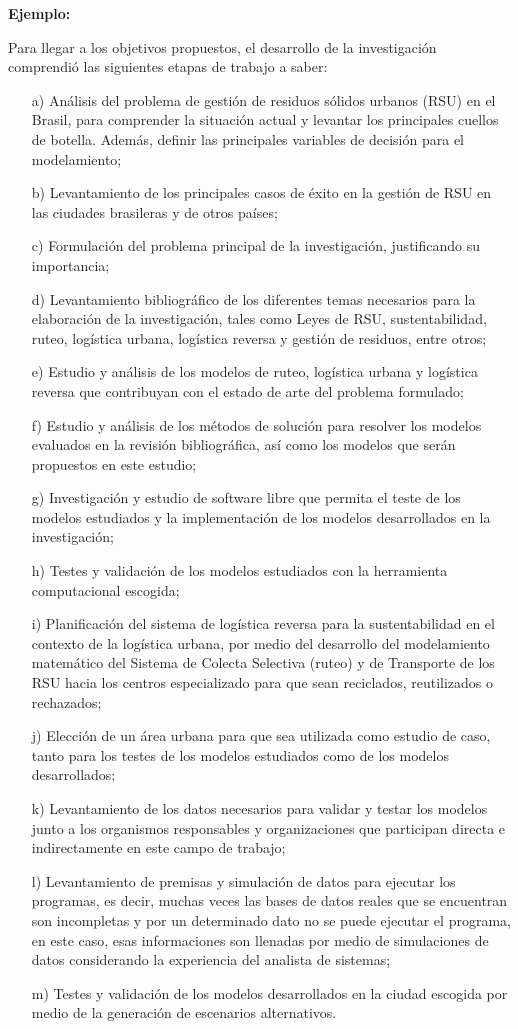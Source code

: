 {\bf Ejemplo:}\par
\vskip 0.1cm
Para llegar a los objetivos propuestos, el desarrollo de la investigación comprendió las siguientes etapas de trabajo a saber:
\begin{enumerate}
\item[a)] Análisis del problema de gestión de residuos sólidos urbanos (RSU) en el Brasil, para comprender la situación actual y levantar los principales cuellos de botella. Además, definir las principales variables de decisión para el modelamiento;
\item[b)]	Levantamiento de los principales casos de éxito en la gestión de RSU en las ciudades brasileras y de otros países;  
\item[c)]	Formulación del problema principal de la investigación, justificando su importancia;
\item[d)]	Levantamiento bibliográfico de los diferentes temas necesarios para la elaboración de la investigación, tales como Leyes de RSU, sustentabilidad, ruteo, logística urbana, logística reversa y gestión de residuos, entre otros;
\item[e)]	Estudio y análisis de los modelos de ruteo, logística urbana y logística reversa que contribuyan con el estado de arte del problema formulado;
\item[f)]	Estudio y análisis de los métodos de solución para resolver los modelos evaluados en la revisión bibliográfica, así como los modelos que serán propuestos en este estudio;
\item[g)]	Investigación y estudio de software libre que permita el teste de los modelos estudiados y la implementación de los modelos desarrollados en la investigación;
\item[h)]	Testes y validación de los modelos estudiados con la herramienta computacional escogida;
\item[i)]	Planificación del sistema de logística reversa para la sustentabilidad en el contexto de la logística urbana, por medio del desarrollo del modelamiento matemático del Sistema de Colecta Selectiva (ruteo) y de Transporte de los RSU hacia los centros especializado para que sean reciclados, reutilizados o rechazados;
\item[j)]	Elección de un área urbana para que sea utilizada como estudio de caso,  tanto para los testes de los modelos estudiados como de los modelos desarrollados;
\item[k)]	Levantamiento de los datos necesarios para validar y testar los modelos junto a los organismos responsables y organizaciones que participan directa e indirectamente en este campo de trabajo;
\item[l)]	Levantamiento de premisas y simulación de datos para ejecutar los programas, es decir, muchas veces las bases de datos reales que se encuentran son incompletas y por un determinado dato no se puede ejecutar el programa, en este caso, esas informaciones son llenadas por medio de simulaciones de datos considerando la experiencia del analista de sistemas;
\item[m)]	Testes y validación de los modelos desarrollados en la ciudad escogida por medio de la generación de escenarios alternativos.    
\end{enumerate}


